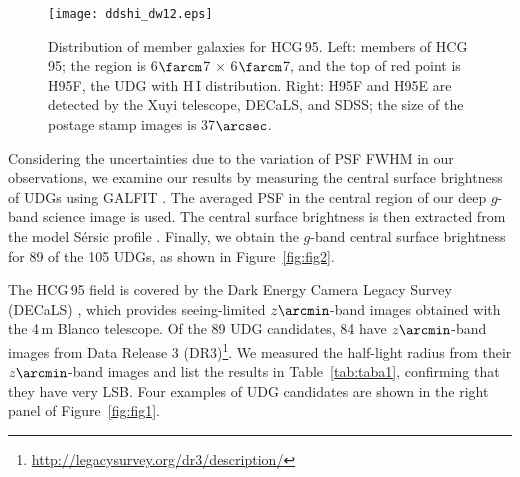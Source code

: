 \documentclass[twocolumn,trackchanges]{aastex61}
\begin{document}
\begin{figure*}
 \begin{center}
 \setlength{\abovecaptionskip}{-40pt}
  \texttt{[image: ddshi\_dw12.eps]} 
  \caption{Distribution of member galaxies for HCG\,95. Left: members of HCG\,95; the region is 6$\farcm$7 $\times$ 6$\farcm$7, and the top of red point is H95F, the UDG with H\,I distribution. Right: H95F and H95E are detected by the Xuyi telescope, DECaLS, and SDSS; the size of the postage stamp images is 37$\arcsec$.}
  \label{fig:fig3}
 \end{center}
\end{figure*}





Considering the uncertainties due to the variation of PSF FWHM in our observations, we examine our results by measuring the central surface brightness of UDGs using GALFIT \citep{peng2002}. The averaged PSF in the central region of our deep $g$-band science image is used. The central surface brightness is then extracted from the model S{\'e}rsic profile \citep{Graham2005,Zhong2008}. Finally, we obtain the $g$-band central surface brightness for 89 of the 105 UDGs, as shown in Figure~\ref{fig:fig2}.

The HCG\,95 field is covered by the Dark Energy Camera Legacy Survey (DECaLS) \citep{Blum2016}, which provides seeing-limited $z\arcmin$-band images obtained with the 4\,m Blanco telescope. Of the 89 UDG candidates, 84 have $z\arcmin$-band images from Data Release 3 (DR3)\footnote{\url{http://legacysurvey.org/dr3/description/}}. We measured the half-light radius from their $z\arcmin$-band images and list the results in Table~\ref{tab:taba1}, confirming that they have very LSB. Four examples of UDG candidates are shown in the right panel of Figure~\ref{fig:fig1}. 
\end{document}
